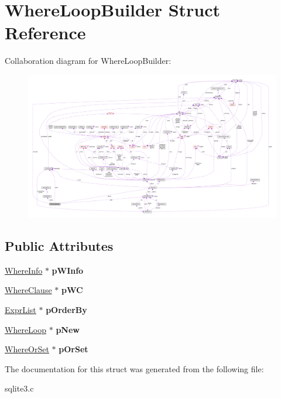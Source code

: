 \hypertarget{structWhereLoopBuilder}{}\section{Where\+Loop\+Builder Struct Reference}
\label{structWhereLoopBuilder}


Collaboration diagram for Where\+Loop\+Builder\+:\nopagebreak
\begin{figure}[H]
\begin{center}
\leavevmode
\includegraphics[width=350pt]{structWhereLoopBuilder__coll__graph}
\end{center}
\end{figure}
\subsection*{Public Attributes}
\begin{DoxyCompactItemize}
\item 
\hyperlink{structWhereInfo}{Where\+Info} $\ast$ {\bfseries p\+W\+Info}\hypertarget{structWhereLoopBuilder_a45e1ed33ef11ee2c08af6edcda9e5654}{}\label{structWhereLoopBuilder_a45e1ed33ef11ee2c08af6edcda9e5654}

\item 
\hyperlink{structWhereClause}{Where\+Clause} $\ast$ {\bfseries p\+WC}\hypertarget{structWhereLoopBuilder_aff76c3f8b34e4588c587708d59fb6bc9}{}\label{structWhereLoopBuilder_aff76c3f8b34e4588c587708d59fb6bc9}

\item 
\hyperlink{structExprList}{Expr\+List} $\ast$ {\bfseries p\+Order\+By}\hypertarget{structWhereLoopBuilder_a16de740f297add3d4b36905c21554a86}{}\label{structWhereLoopBuilder_a16de740f297add3d4b36905c21554a86}

\item 
\hyperlink{structWhereLoop}{Where\+Loop} $\ast$ {\bfseries p\+New}\hypertarget{structWhereLoopBuilder_ae3ab5ddb99b1d4697f573e9b25442f65}{}\label{structWhereLoopBuilder_ae3ab5ddb99b1d4697f573e9b25442f65}

\item 
\hyperlink{structWhereOrSet}{Where\+Or\+Set} $\ast$ {\bfseries p\+Or\+Set}\hypertarget{structWhereLoopBuilder_adf94dbe3918353f2d9ebfc0bf69d9685}{}\label{structWhereLoopBuilder_adf94dbe3918353f2d9ebfc0bf69d9685}

\end{DoxyCompactItemize}


The documentation for this struct was generated from the following file\+:\begin{DoxyCompactItemize}
\item 
sqlite3.\+c\end{DoxyCompactItemize}
